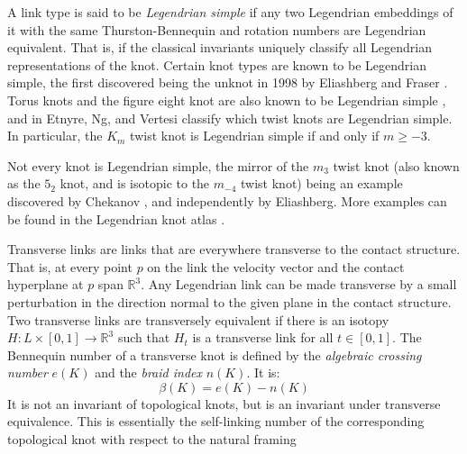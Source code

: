 \documentclass{article}
\theoremstyle{plain}
\begin{document}
        A link type is said to be \textit{Legendrian simple} if
        any two Legendrian embeddings of it with the same Thurston-Bennequin
        and rotation numbers are Legendrian equivalent. That is, if the classical
        invariants uniquely classify all Legendrian representations of the knot.
        Certain knot types are known to be Legendrian simple, the first
        discovered being the unknot in 1998
        by Eliashberg and Fraser
        \cite{EliashbergFraserClassificationTopTrivialLegKnots}.
        Torus knots and the figure eight knot are also known to be Legendrian
        simple
        \cite{EtnyreHondaContactTopologyI}, and in
        \cite{EtnyreEtAlLegendrianAndTransverseTwistKnots} Etnyre, Ng, and
        Vertesi classify which twist knots are Legendrian simple. In particular,
        the $K_{m}$ twist knot is Legendrian simple if and only if
        $m\geq{-3}$.
        \par\hfill\par
        Not every knot is Legendrian simple, the mirror of the $m_{3}$ twist
        knot (also known as the $5_{2}$ knot, and is isotopic to the
        $m_{-4}$ twist knot) being an example discovered by Chekanov
        \cite{ChekanovDifAlgOfLegLinks}, and independently by
        Eliashberg.
        More examples can be found in the
        Legendrian knot atlas \cite{LegendrianKnotAtlas}.
        \par\hfill\par
        Transverse links are links that are everywhere transverse to the
        contact structure. That is, at every point $p$ on the link the velocity
        vector and the contact hyperplane at $p$ span $\mathbb{R}^{3}$.
        Any Legendrian
        link can be made transverse by a small perturbation in the direction
        normal to the given plane in the contact structure.
        Two transverse links are transversely equivalent if there is an
        isotopy $H:L\times[0,1]\rightarrow\mathbb{R}^{3}$ such that $H_{t}$ is a
        transverse link for all $t\in[0,1]$. The Bennequin number of a
        transverse knot is defined by the \textit{algebraic crossing number}
        $e(K)$ and the \textit{braid index} $n(K)$. It is:
        \begin{equation}
            \beta(K)=e(K)-n(K)
        \end{equation}
        It is not an invariant of topological knots, but is an invariant under
        transverse equivalence. This is essentially the self-linking number of
        the corresponding topological knot with respect to the natural framing
\end{document}
